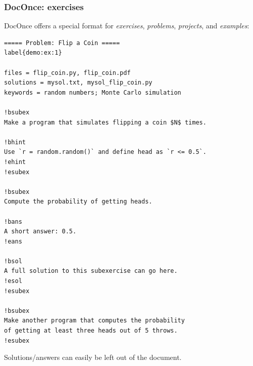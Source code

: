 \documentclass{beamer}
\begin{document}
\begin{frame}
\frametitle{DocOnce: exercises}

DocOnce offers a special format for \emph{exercises}, \emph{problems}, \emph{projects},
and \emph{examples}:

































\begin{verbatim}
===== Problem: Flip a Coin =====
label{demo:ex:1}

files = flip_coin.py, flip_coin.pdf
solutions = mysol.txt, mysol_flip_coin.py
keywords = random numbers; Monte Carlo simulation

!bsubex
Make a program that simulates flipping a coin $N$ times.

!bhint
Use `r = random.random()` and define head as `r <= 0.5`.
!ehint
!esubex

!bsubex
Compute the probability of getting heads.

!bans
A short answer: 0.5.
!eans

!bsol
A full solution to this subexercise can go here.
!esol
!esubex

!bsubex
Make another program that computes the probability
of getting at least three heads out of 5 throws.
!esubex

\end{verbatim}


Solutions/answers can easily be left out of the document.
\end{frame}
\end{document}
